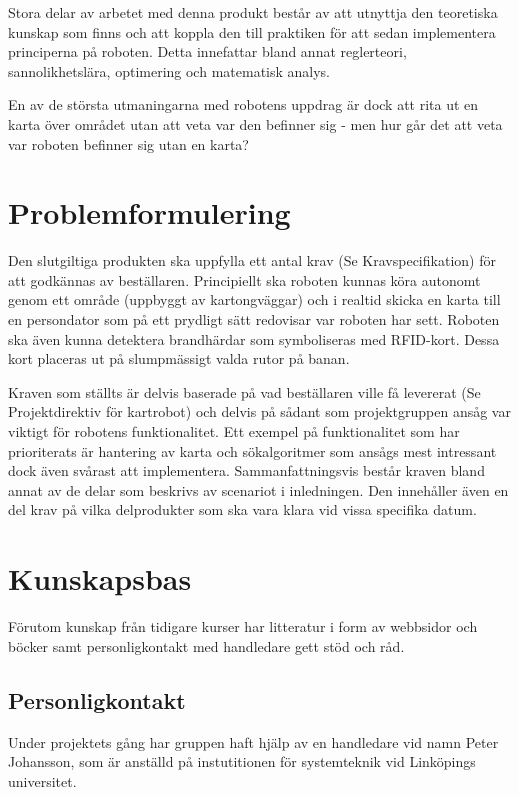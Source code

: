 \documentclass[a4paper,12pt,fleqn]{article}
\begin{document}
Stora delar av arbetet med denna produkt består av att utnyttja den teoretiska kunskap som finns och att koppla den till praktiken för att sedan implementera principerna på roboten. 
Detta innefattar bland annat reglerteori, sannolikhetslära, optimering och matematisk analys.

En av de största utmaningarna med robotens uppdrag är dock att rita ut en karta över området utan att veta var den befinner sig - men hur går det att veta var roboten befinner sig utan en karta? 

\section{Problemformulering}

Den slutgiltiga produkten ska uppfylla ett antal krav (Se Kravspecifikation) för att godkännas av beställaren. Principiellt ska roboten kunnas köra autonomt genom ett område (uppbyggt av kartongväggar) och i realtid skicka en karta till en persondator som på ett prydligt sätt redovisar var roboten har sett. Roboten ska även kunna detektera brandhärdar som symboliseras med RFID-kort. Dessa kort placeras ut på slumpmässigt valda rutor på banan. 

Kraven som ställts är delvis baserade på vad beställaren ville få levererat (Se Projektdirektiv för kartrobot) och delvis på sådant som projektgruppen ansåg var viktigt för robotens funktionalitet. Ett exempel på funktionalitet som har prioriterats är hantering av karta och sökalgoritmer som ansågs mest intressant dock även svårast att implementera. 
Sammanfattningsvis består kraven bland annat av de delar som beskrivs av scenariot i inledningen. Den innehåller även en del krav på vilka delprodukter som ska vara klara vid vissa specifika datum.

\section{Kunskapsbas}

Förutom kunskap från tidigare kurser har litteratur i form av webbsidor och böcker samt personligkontakt med handledare gett stöd och råd. 

\subsection{Personligkontakt}
Under projektets gång har gruppen haft hjälp av en handledare vid namn Peter Johansson, som är anställd på instutitionen för systemteknik vid Linköpings universitet. 
\end{document}
